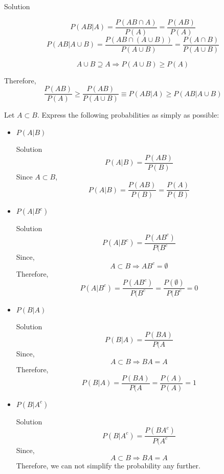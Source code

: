 \documentclass{article}
\begin{document}
\begin{spacing}{1.1}
\begin{homeworkProblem}
  \begin{homeworkSection}{Solution}

    \[P(AB|A) = \frac{ P( AB \cap A)}{ P( A)} = \frac{ P( AB)}{ P( A)}\]
    \[P( AB|A \cup B) = \frac{ P( AB \cap (A \cup B))}{ P( A \cup B)} = \frac{ P( A \cap B)}{ P( A \cup B)}\]

    \[ A \cup B \supseteq A \Rightarrow P( A \cup B) \ge P( A)\]

    Therefore,
      \[\frac{ P( AB)}{ P( A)} \ge \frac{ P( AB)}{ P( A \cup B)} \equiv P(AB|A) \ge P( AB|A \cup B)\]
    
  \end{homeworkSection}
\end{homeworkProblem}
\newpage
\begin{homeworkProblem}
  Let $A \subset B$. Express the following probabilities as simply as possible:
  \begin{itemize}
    \item $P( A|B)$
      \begin{homeworkSection}{Solution}
        \[P( A|B) = \frac{ P( AB)}{ P(B)}\]
        Since $A \subset B$, 
        \[P( A|B) = \frac{ P( AB)}{ P(B)} = \frac{ P( A)}{ P( B)}\]
     \end{homeworkSection}
    \item $P( A|B^c)$
      \begin{homeworkSection}{Solution}
        \[P( A|B^c) = \frac{ P( AB^c)}{ P( B^c}\]
        Since,
          \[A \subset B \Rightarrow AB^c = \emptyset\]
        Therefore,
        \[P( A|B^c) = \frac{ P( AB^c)}{ P( B^c} = \frac{ P( \emptyset)}{ P( B^c} = 0\]
      \end{homeworkSection}
    \item $P( B|A)$
      \begin{homeworkSection}{Solution}
        \[P( B|A) = \frac{ P( BA)}{ P( A}\]
        Since,
          \[A \subset B \Rightarrow BA = A\]
        Therefore,
        \[P( B|A) = \frac{ P( BA)}{ P( A} = \frac{ P( A)}{ P( A)} = 1\]
      \end{homeworkSection}
    \item $P( B|A^c)$
      \begin{homeworkSection}{Solution}
        \[P( B|A^c) = \frac{ P( BA^c)}{ P( A^c}\]
        Since,
          \[A \subset B \Rightarrow BA = A\]
        Therefore, we can not simplify the probability any further.
      \end{homeworkSection}
  \end{itemize}
\end{homeworkProblem}

\end{spacing}
\end{document}
